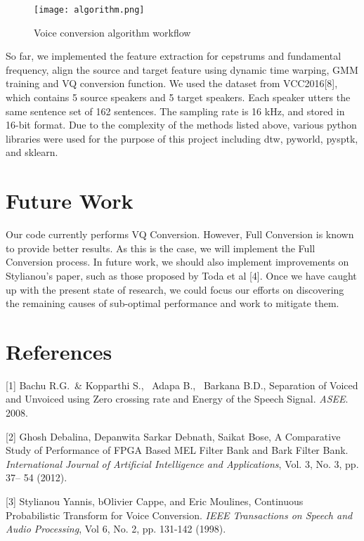 \documentclass{article}
\begin{document}
\begin{figure}
\centering
\texttt{[image: algorithm.png]}
\caption{Voice conversion algorithm workflow}\label{fig:algo}
\end{figure}


So far, we implemented the feature extraction for cepstrums and fundamental frequency, align the source and target feature using dynamic time warping, GMM training and VQ conversion function. We used the dataset from VCC2016[8], which contains 5 source speakers and 5 target speakers. Each speaker utters the same sentence set of 162 sentences. The sampling rate is 16 kHz, and stored in 16-bit format. Due to the complexity of the methods listed above, various python libraries were used for the purpose of this project including dtw, pyworld, pysptk, and sklearn.

\section{Future Work}
  Our code currently performs VQ Conversion. However, Full Conversion is known to provide better results. As this is the case, we will implement the Full Conversion process. In future work, we should also implement improvements on Stylianou's paper, such as those proposed by Toda et al [4]. Once we have caught up with the present state of research, we could focus our efforts on discovering the remaining causes of sub-optimal performance and work to mitigate them.

\section*{References}

\small

[1] Bachu R.G.\ \& Kopparthi S., \ Adapa B., \ Barkana B.D., Separation of Voiced and Unvoiced using Zero crossing rate and Energy of the Speech Signal.  {\it ASEE}. 2008. 
 
[2] Ghosh Debalina,  Depanwita Sarkar Debnath, Saikat Bose, A Comparative Study of Performance of FPGA Based MEL Filter Bank and Bark Filter Bank. {\it International Journal of Artificial Intelligence and Applications}, Vol. 3, No. 3, pp. 37-- 54 (2012). 
 
[3] Stylianou  Yannis,  bOlivier Cappe, and Eric Moulines, Continuous Probabilistic Transform for Voice Conversion. {\it IEEE Transactions on Speech and Audio Processing}, Vol 6, No. 2, pp. 131-142 (1998). 
 
\end{document}
